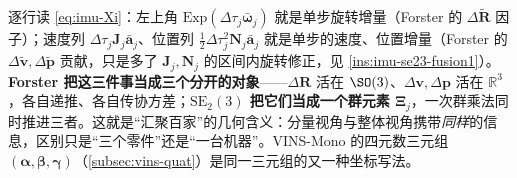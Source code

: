 \begin{insight}[殊途同归之二：$\boldsymbol\Xi_j$ 的三行 $=$ Forster 的 $\Delta\mathbf R,\Delta\mathbf v,\Delta\mathbf p$ 装进一个群元素]\label{ins:imu-se23-fusion2}
逐行读 \cref{eq:imu-Xi}：左上角 $\mathrm{Exp}(\Delta\tau_j\bar{\boldsymbol\omega}_j)$ 就是单步旋转增量（Forster 的 $\Delta\tilde{\mathbf R}$ 因子）；速度列 $\Delta\tau_j\mathbf J_j\bar{\mathbf a}_j$、位置列 $\tfrac12\Delta\tau_j^2\mathbf N_j\bar{\mathbf a}_j$ 就是单步的速度、位置增量（Forster 的 $\Delta\tilde{\mathbf v},\Delta\tilde{\mathbf p}$ 贡献，只是多了 $\mathbf J_j,\mathbf N_j$ 的区间内旋转修正，见 \cref{ins:imu-se23-fusion1}）。\textbf{Forster 把这三件事当成三个分开的对象}——$\Delta\mathbf R$ 活在 $\SO(3)$、$\Delta\mathbf v,\Delta\mathbf p$ 活在 $\mathbb R^3$，各自递推、各自传协方差；\textbf{$\mathrm{SE}_2(3)$ 把它们当成一个群元素 $\boldsymbol\Xi_j$}，一次群乘法同时推进三者。这就是“汇聚百家”的几何含义：分量视角与整体视角携带\emph{同样}的信息，区别只是“三个零件”还是“一台机器”。VINS-Mono 的四元数三元组 $(\boldsymbol\alpha,\boldsymbol\beta,\boldsymbol\gamma)$（\cref{subsec:vins-quat}）是同一三元组的又一种坐标写法。
\end{insight}

